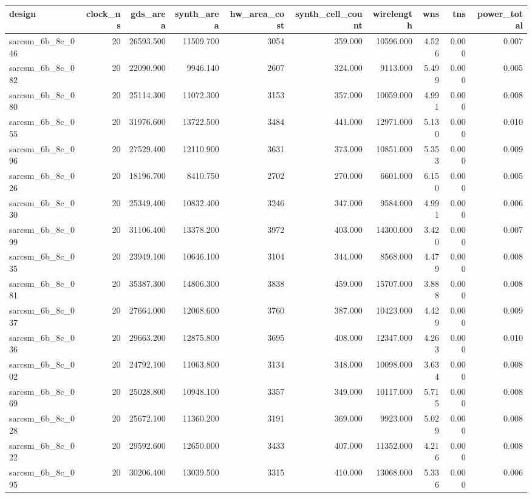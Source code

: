 \begin{tabular}{lrrrrrrrrr}
\toprule
design & clock\_ns & gds\_area & synth\_area & hw\_area\_cost & synth\_cell\_count & wirelength & wns & tns & power\_total \\
\midrule
sarcsm\_6b\_8c\_046 & 20 & 26593.500 & 11509.700 & 3054 & 359.000 & 10596.000 & 4.526 & 0.000 & 0.007 \\
sarcsm\_6b\_8c\_082 & 20 & 22090.900 & 9946.140 & 2607 & 324.000 & 9113.000 & 5.499 & 0.000 & 0.005 \\
sarcsm\_6b\_8c\_080 & 20 & 25114.300 & 11072.300 & 3153 & 357.000 & 10059.000 & 4.991 & 0.000 & 0.008 \\
sarcsm\_6b\_8c\_055 & 20 & 31976.600 & 13722.500 & 3484 & 441.000 & 12971.000 & 5.130 & 0.000 & 0.010 \\
sarcsm\_6b\_8c\_096 & 20 & 27529.400 & 12110.900 & 3631 & 373.000 & 10851.000 & 5.353 & 0.000 & 0.009 \\
sarcsm\_6b\_8c\_026 & 20 & 18196.700 & 8410.750 & 2702 & 270.000 & 6601.000 & 6.150 & 0.000 & 0.005 \\
sarcsm\_6b\_8c\_030 & 20 & 25349.400 & 10832.400 & 3246 & 347.000 & 9584.000 & 4.991 & 0.000 & 0.006 \\
sarcsm\_6b\_8c\_099 & 20 & 31106.400 & 13378.200 & 3972 & 403.000 & 14300.000 & 3.420 & 0.000 & 0.007 \\
sarcsm\_6b\_8c\_035 & 20 & 23949.100 & 10646.100 & 3104 & 344.000 & 8568.000 & 4.479 & 0.000 & 0.008 \\
sarcsm\_6b\_8c\_081 & 20 & 35387.300 & 14806.300 & 3838 & 459.000 & 15707.000 & 3.888 & 0.000 & 0.008 \\
sarcsm\_6b\_8c\_037 & 20 & 27664.000 & 12068.600 & 3760 & 387.000 & 10423.000 & 4.429 & 0.000 & 0.009 \\
sarcsm\_6b\_8c\_036 & 20 & 29663.200 & 12875.800 & 3695 & 408.000 & 12347.000 & 4.263 & 0.000 & 0.010 \\
sarcsm\_6b\_8c\_002 & 20 & 24792.100 & 11063.800 & 3134 & 348.000 & 10098.000 & 3.634 & 0.000 & 0.008 \\
sarcsm\_6b\_8c\_069 & 20 & 25028.800 & 10948.100 & 3357 & 349.000 & 10117.000 & 5.715 & 0.000 & 0.008 \\
sarcsm\_6b\_8c\_028 & 20 & 25672.100 & 11360.200 & 3191 & 369.000 & 9923.000 & 5.029 & 0.000 & 0.008 \\
sarcsm\_6b\_8c\_022 & 20 & 29592.600 & 12650.000 & 3433 & 407.000 & 11352.000 & 4.216 & 0.000 & 0.008 \\
sarcsm\_6b\_8c\_095 & 20 & 30206.400 & 13039.500 & 3315 & 410.000 & 13068.000 & 5.336 & 0.000 & 0.006 \\

\end{tabular}
